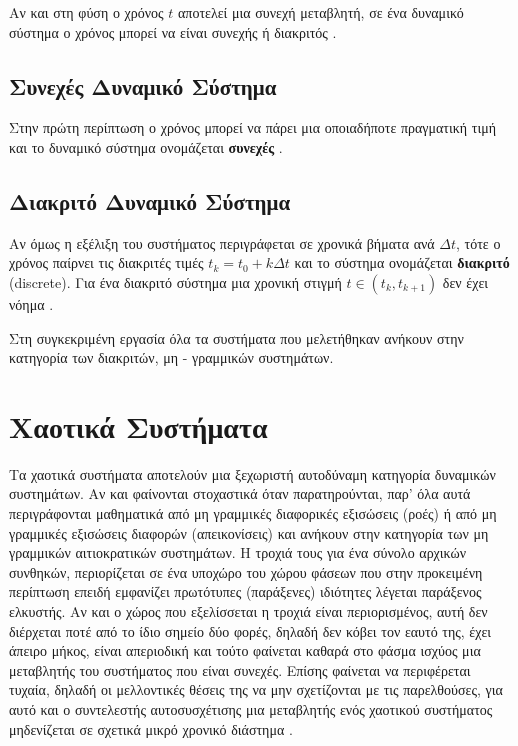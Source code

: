 Αν και στη φύση ο χρόνος $t$ αποτελεί μια συνεχή μεταβλητή, σε ένα δυναμικό σύστημα ο χρόνος μπορεί να είναι συνεχής ή διακριτός \cite{b2}.


\subsection{Συνεχές Δυναμικό Σύστημα}

Στην πρώτη περίπτωση ο χρόνος μπορεί να πάρει μια οποιαδήποτε πραγματική τιμή και το δυναμικό σύστημα ονομάζεται \textbf{συνεχές} \cite{b2}.

\subsection{Διακριτό Δυναμικό Σύστημα}
Αν όμως η εξέλιξη του συστήματος περιγράφεται σε χρονικά βήματα ανά $Δt$, τότε ο χρόνος παίρνει τις διακριτές τιμές $t_k = t_0 + kΔt$ και το σύστημα ονομάζεται \textbf{διακριτό} (discrete). 
Για ένα διακριτό σύστημα μια χρονική στιγμή $t \in(t_k,t_{k+1}) $ δεν έχει νόημα \cite{b2}.

Στη συγκεκριμένη εργασία όλα τα συστήματα που μελετήθηκαν ανήκουν στην κατηγορία των διακριτών, μη - γραμμικών συστημάτων.

\clearpage

\section{Χαοτικά Συστήματα}

Τα χαοτικά συστήματα αποτελούν μια ξεχωριστή αυτοδύναμη κατηγορία δυναμικών συστημάτων. Αν και φαίνονται στοχαστικά όταν παρατηρούνται, παρ’ όλα αυτά περιγράφονται μαθηματικά από μη γραμμικές διαφορικές εξισώσεις (ροές) ή από μη
γραμμικές εξισώσεις διαφορών (απεικονίσεις) και ανήκουν στην κατηγορία των μη γραμμικών αιτιοκρατικών συστημάτων. Η τροχιά τους για ένα σύνολο αρχικών συνθηκών, περιορίζεται σε ένα υποχώρο του χώρου φάσεων που στην προκειμένη περίπτωση επειδή εμφανίζει πρωτότυπες (παράξενες) ιδιότητες λέγεται παράξενος ελκυστής. Αν και ο χώρος που εξελίσσεται η τροχιά είναι περιορισμένος, αυτή δεν διέρχεται ποτέ από το ίδιο σημείο δύο φορές, δηλαδή δεν κόβει τον εαυτό της, έχει άπειρο μήκος, είναι απεριοδική και τούτο φαίνεται καθαρά στο φάσμα ισχύος μια μεταβλητής του συστήματος που είναι συνεχές. Επίσης φαίνεται να περιφέρεται τυχαία, δηλαδή οι μελλοντικές θέσεις της να μην σχετίζονται με τις παρελθούσες, για αυτό και ο συντελεστής αυτοσυσχέτισης μια μεταβλητής ενός χαοτικού συστήματος μηδενίζεται
σε σχετικά μικρό χρονικό διάστημα \cite{b3}.


